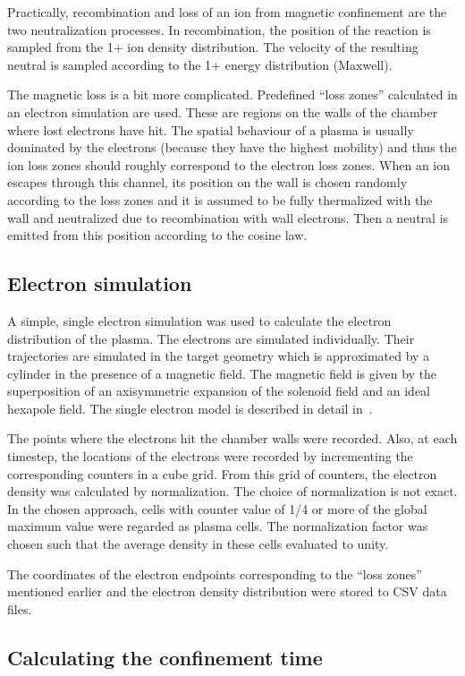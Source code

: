 \documentclass[a4paper,twoside,12pt]{article}
\begin{document}
Practically, recombination and loss of an ion from magnetic confinement are the two neutralization processes. In recombination, the position of the reaction is sampled from the 1+ ion density distribution. The velocity of the resulting neutral is sampled according to the 1+ energy distribution (Maxwell).

The magnetic loss is a bit more complicated. Predefined ``loss zones'' calculated in an electron simulation are used. These are regions on the walls of the chamber where lost electrons have hit. The spatial behaviour of a plasma is usually dominated by the electrons (because they have the highest mobility) and thus the ion loss zones should roughly correspond to the electron loss zones. When an ion escapes through this channel, its position on the wall is chosen randomly according to the loss zones and it is assumed to be fully thermalized with the wall and neutralized due to recombination with wall electrons. Then a neutral is emitted from this position according to the cosine law.

\subsection{Electron simulation}
A simple, single electron simulation was used to calculate the electron distribution of the plasma. The electrons are simulated individually. Their trajectories are simulated in the target geometry which is approximated by a cylinder in the presence of a magnetic field. The magnetic field is given by the superposition of an axisymmetric expansion of the solenoid field and an ideal hexapole field. The single electron model is described in detail in~\cite{kalvas:hiisi}.

The points where the electrons hit the chamber walls were recorded. Also, at each timestep, the locations of the electrons were recorded by incrementing the corresponding counters in a cube grid. From this grid of counters, the electron density was calculated by normalization. The choice of normalization is not exact. In the chosen approach, cells with counter value of 1/4 or more of the global maximum value were regarded as plasma cells. The normalization factor was chosen such that the average density in these cells evaluated to unity.

The coordinates of the electron endpoints corresponding to the ``loss zones'' mentioned earlier and the electron density distribution were stored to CSV data files.

\subsection{Calculating the confinement time}
\end{document}
